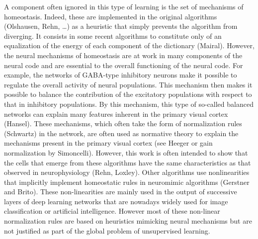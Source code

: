 \documentclass[a4paper, 11pt, draft]{article} %
\begin{document}
A component often ignored in this type of learning is the set of
mechanisms of homeostasis. Indeed, these are implemented in the original
algorithms (Olshausen, Rehn, \ldots{}) as a heuristic that simply
prevents the algorithm from diverging. It consists in some recent
algorithms to constitute only of an equalization of the energy of each
component of the dictionary (Mairal). However, the neural mechanisms of
homeostasis are at work in many components of the neural code and are
essential to the overall functioning of the neural code. For example,
the networks of GABA-type inhibitory neurons make it possible to
regulate the overall activity of neural populations. This mechanism then
makes it possible to balance the contribution of the excitatory
populations with respect to that in inhibitory populations. By this
mechanism, this type of so-called balanced networks can explain many
features inherent in the primary visual cortex (Hansel). These
mechanisms, which often take the form of normalization rules (Schwartz)
in the network, are often used as normative theory to explain the
mechanisms present in the primary visual cortex (see Heeger or gain normalization by Simoncelli). However,
this work is often intended to show that the cells that emerge from
these algorithms have the same characteristics as that observed in
neurophysiology (Rehn, Loxley). Other algorithms use nonlinearities that
implicitly implement homeostatic rules in neuromimic algorithms
(Gerstner and Brito). These non-linearities are mainly used in the
output of successive layers of deep learning networks that are nowadays
widely used for image classification or artificial intelligence. However
most of these non-linear normalization rules are based on heuristics
mimicking neural mechanisms but are not justified as part of the global
problem of unsupervised learning.
\end{document}
